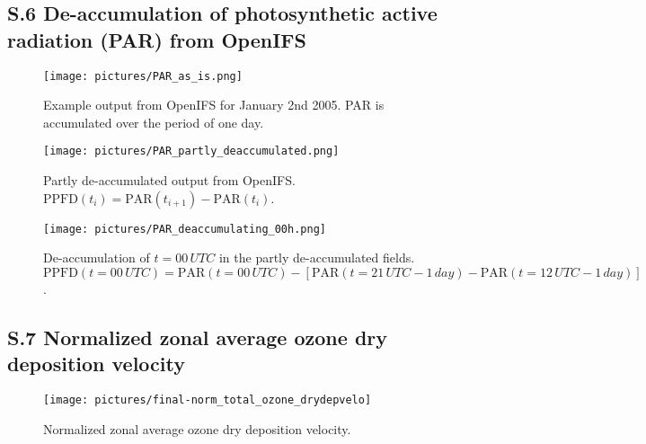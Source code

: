 \documentclass[manuscript]{copernicus}
\begin{document}
\subsection*{S.6 De-accumulation of photosynthetic active radiation (PAR) from OpenIFS}
\begin{figure}[!htbp]
  \centering
  \texttt{[image: pictures/PAR\_as\_is.png]}
  \caption{Example output from OpenIFS for January 2nd 2005. PAR is accumulated over the period of one day.}
\end{figure}

\begin{figure}[!htbp]
  \centering
  \texttt{[image: pictures/PAR\_partly\_deaccumulated.png]}
  \caption{Partly de-accumulated output from OpenIFS. $\text{PPFD}(t_i) = \text{PAR}(t_{i+1})-\text{PAR}(t_i)$.}
\end{figure}

\begin{figure}[!htbp]
  \centering
  \texttt{[image: pictures/PAR\_deaccumulating\_00h.png]}
  \caption{De-accumulation of $t=00\,\unit{UTC}$ in the partly de-accumulated fields. $\text{PPFD}(t=00\,\unit{UTC}) = \text{PAR}(t=00\,\unit{UTC}) - \left[\text{PAR}(t=21\,\unit{UTC}-1\,\unit{day})-\text{PAR}(t=12\,\unit{UTC}-1\,\unit{day})\right]$.}
\end{figure}

\subsection*{S.7 Normalized zonal average ozone dry deposition velocity}
\begin{figure}[!htbp]
  \centering
  \texttt{[image: pictures/final-norm\_total\_ozone\_drydepvelo]}
  \caption{Normalized zonal average ozone dry deposition velocity.}
\end{figure}
\end{document}
